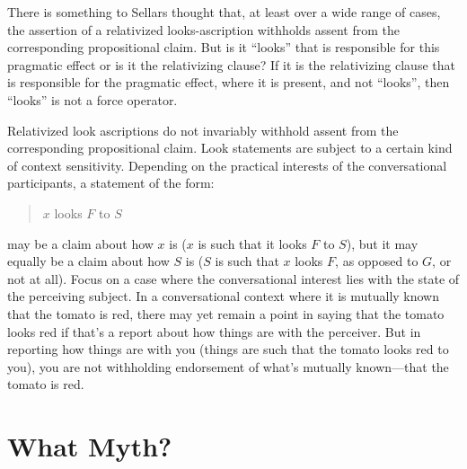 \documentclass[12pt]{article}
\begin{document}
There is something to Sellars thought that, at least over a wide range of cases, the assertion of a relativized looks-ascription withholds assent from the corresponding propositional claim. But is it ``looks'' that is responsible for this pragmatic effect or is it the relativizing clause? If it is the relativizing clause that is responsible for the pragmatic effect, where it is present, and not ``looks'', then ``looks'' is not a force operator.

Relativized look ascriptions do not invariably withhold assent from the corresponding propositional claim. Look statements are subject to a certain kind of context sensitivity. Depending on the practical interests of the conversational participants, a statement of the form:
    \begin{quote}
        \( x \) looks \( F \) to \( S \)
    \end{quote}
    may be a claim about how \( x \) is (\( x \) is such that it looks \( F \) to \( S \)), but it may equally be a claim about how \( S \) is (\( S \) is such that \( x \) looks \( F \), as opposed to \( G \), or not at all). Focus on a case where the conversational interest lies with the state of the perceiving subject. In a conversational context where it is mutually known that the tomato is red, there may yet remain a point in saying that the tomato looks red if that's a report about how things are with the perceiver. But in reporting how things are with you (things are such that the tomato looks red to you), you are not withholding endorsement of what's mutually known---that the tomato is red.


\section{What Myth?} %
\label{sec:what_myth_}


 
 
\end{document}
